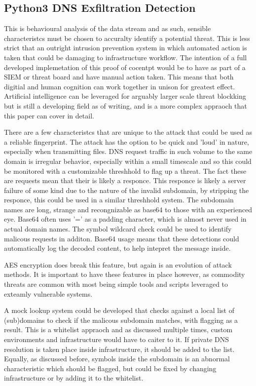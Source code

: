 
\subsection{Python3 DNS Exfiltration Detection}
This is behavioural analysis of the data stream and as such, sensible characteristcs must be chosen to accuralty identify a potential threat. This is less strict that an outright intrusion prevention system in which automated action is taken that could be damaging to infrastructure workflow. The intention of a full developed implemetation of this proof of cocentpt would be to have as part of a SIEM or threat board and have manual action taken. This means that both digitial and human cognition can work together in unison for greatest effect.
Artificial intelligence can be leveraged for arguably larger scale threat blockking but is still a developing field as of writing, and is a more complex appraoch that this paper can cover in detail.

There are a few characteristcs that are unique to the attack that could be used as a reliable fingerprint. The attack has the option to be quick and 'loud' in nature, especially when transmitting files. DNS request traffic in such volume to the same domain is irregular behavior, especially within a small timescale and so this could be monitored with a customizable threshhold to flag up a threat.
The fact these are requests mean that their is likely a responce. This responce is likely a server failure of some kind due to the nature of the invalid subdomain, by stripping the responce, this could be used in a similar threshhold system. The subdomain names are long, strange and recongnizable as base64 to those with an experienced eye. Base64 often uses '=' as a padding character, which is almost never used in actual domain names. The symbol wildcard check could be used to identify malicous requests in additon. Base64 usage means that these detections could automatically log the decoded content, to help intepret the message inside.

AES encryption does break this feature, but again is an evolution of attack methods. It is important to have these features in place however, as commodity threats are common with most being simple tools and scripts leveraged to exteamly vulnerable systems. 

A mock lookup system could be developed that checks against a local list of (sub)domains to check if the malicous subdomain matches, with flagging as a result. This is a whitelist appraoch and as discussed multiple times, custom environments and infrastructure would have to caiter to it. If private DNS resolution is taken place inside infrastructure, it should be added to the list. Equally, as discussed before, symbols inside the subdomain is an abnormal characteristic which should be flagged, but could be fixed by changing infrastructure or by adding it to the whitelist. 

